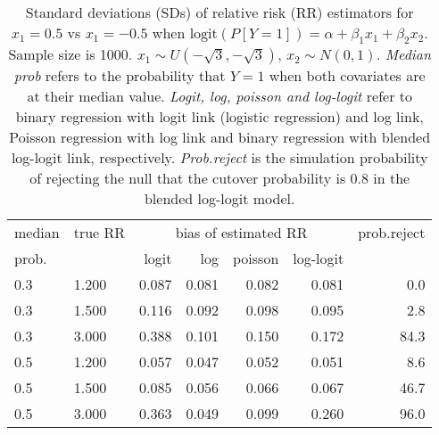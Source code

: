 \documentclass[12pt,a4paper]{article}
\begin{document}
\begin{table}[H] 
\small\sf\centering 
\caption{Standard deviations (SDs) of relative risk (RR) estimators for $x_1=0.5$ vs $x_1=-0.5$ when $\mbox{logit}(P[Y=1])=\alpha+\beta_1 x_1 + \beta_2 x_2$. Sample size is 1000. $x_1 \sim $$U(-\sqrt{3},-\sqrt{3})$, $x_2 \sim N(0,1)$. {\it Median prob} refers to the probability that $Y=1$ when both covariates are at their median value. {\it Logit, log, poisson and log-logit} refer to binary regression with logit link (logistic regression) and log link, Poisson regression with log link and binary regression with blended log-logit link, respectively. {\it Prob.reject} is the simulation probability of rejecting the null that the cutover probability is $0.8$ in the blended log-logit model.} 
\begin{tabular}{llrrrrr} 
\toprule 
median & true RR & \multicolumn{4}{c}{bias of estimated RR} & prob.reject \\ 
prob. & & logit & log & poisson & log-logit  & \\ \midrule 
0.3 & 1.200 & 0.087 & 0.081 & 0.082 & 0.081 &  0.0 \\  
0.3 & 1.500 & 0.116 & 0.092 & 0.098 & 0.095 &  2.8 \\  
0.3 & 3.000 & 0.388 & 0.101 & 0.150 & 0.172 & 84.3 \\  
0.5 & 1.200 & 0.057 & 0.047 & 0.052 & 0.051 &  8.6 \\  
0.5 & 1.500 & 0.085 & 0.056 & 0.066 & 0.067 & 46.7 \\  
0.5 & 3.000 & 0.363 & 0.049 & 0.099 & 0.260 & 96.0 \\  
\bottomrule 
\end{tabular} 
\end{table} 
\end{document}
